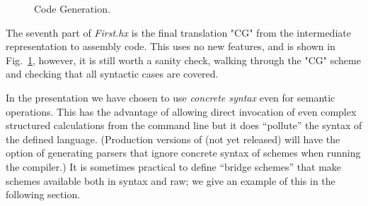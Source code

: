 \documentclass[11pt]{article} %
\begin{document}
\begin{figure}[p]\small
{}
  \caption{Code Generation.}
  \label{fig:cgen}
\end{figure}

\begin{example}\label{ex:cgen}
  The seventh part of \emph{First.hx} is the final translation "CG" from the intermediate
  representation to assembly code. This uses no new features, and is shown in Fig.~\ref{fig:cgen},
  however, it is still worth a sanity check, walking through the "CG" scheme and checking that all
  syntactic cases are covered.
\end{example}

\begin{remark}
  In the presentation we have chosen to use \emph{concrete syntax} even for semantic
  operations. This has the advantage of allowing direct invocation of even complex structured
  calculations from the command line but it does ``pollute'' the syntax of the defined language.
  (Production versions of \HAX (not yet released) will have the option of generating parsers that
  ignore concrete syntax of schemes when running the compiler.) It is sometimes practical to define
  ``bridge schemes'' that make schemes available both in syntax and raw; we give an example of this
  in the following section.
\end{remark}
\end{document}

